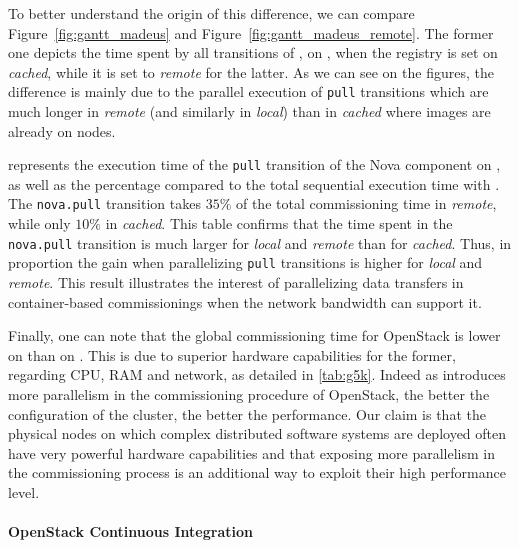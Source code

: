 To better understand the origin of this difference, we can compare
Figure~\ref{fig:gantt_madeus} and
Figure~\ref{fig:gantt_madeus_remote}. The former one depicts the time
spent by all transitions of \madass, on \ecotype, when the \docker
registry is set on \emph{cached}, while it is set to \emph{remote} for
the latter. As we can see on the figures, the difference is mainly due
to the parallel execution of \texttt{pull} transitions which are much
longer in \emph{remote} (and similarly in \emph{local}) than in
\emph{cached} where images are already on nodes.

 represents the execution time of the \texttt{pull}
transition of the Nova component on \ecotype, as well as the
percentage compared to the total sequential execution time with
\madass. The \texttt{nova.pull} transition takes $35\%$ of the total
commissioning time in \emph{remote}, while only $10\%$ in
\emph{cached}. This table confirms that the time spent in the
\texttt{nova.pull} transition is much larger for \emph{local} and
\emph{remote} than for \emph{cached}. Thus, in proportion the gain
when parallelizing \texttt{pull} transitions is higher for
\emph{local} and \emph{remote}. This result illustrates the interest
of parallelizing data transfers in container-based commissionings when
the network bandwidth can support it.

Finally, one can note that the global commissioning time for OpenStack
is lower on \ecotype than on \nova. This is due to superior hardware
capabilities for the former, regarding CPU, RAM and network, as
detailed in \cref{tab:g5k}. Indeed as \mad introduces more parallelism
in the commissioning procedure of OpenStack, the better the
configuration of the cluster, the better the performance. Our claim is
that the physical nodes on which complex distributed software systems
are deployed often have very powerful hardware capabilities and that
exposing more parallelism in the commissioning process is an
additional way to exploit their high performance level.


\paragraph{OpenStack Continuous Integration}

